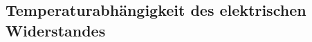 \documentclass[12pt,a4paper]{article}
\begin{document}
\begin{multicols}{2}




%			
%


\section{Temperaturabhängigkeit des elektrischen Widerstandes}


\end{multicols}
\end{document}
